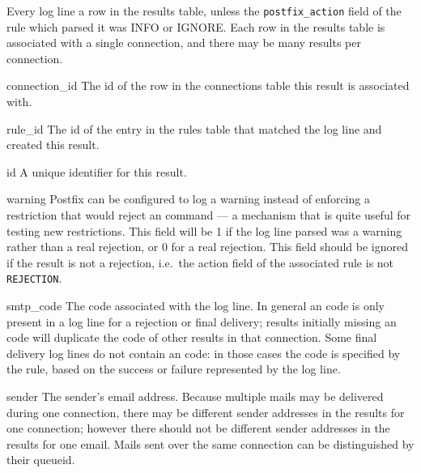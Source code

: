 \label{results table}

Every log line a row in the results table, unless the
\texttt{postfix\_action} field of the rule which parsed it was INFO or
IGNORE\@.  Each row in the results table is associated with a single
connection, and there may be many results per connection.

\begin{eqlist}

    \item [connection\_id] The id of the row in the connections table this
        result is associated with.

    \item [rule\_id] The id of the entry in the rules table that matched
        the log line and created this result.

    \item [id] A unique identifier for this result.

    \item [warning] Postfix can be configured to log a warning instead of
        enforcing a restriction that would reject an \SMTP{} command --- a
        mechanism that is quite useful for testing new restrictions.  This
        field will be 1 if the log line parsed was a warning rather than a
        real rejection, or 0 for a real rejection.  This field should be
        ignored if the result is not a rejection, i.e.\ the action field of
        the associated rule is not \texttt{REJECTION}.

    \item [smtp\_code] The \SMTP{} code associated with the log line.  In
        general an \SMTP{} code is only present in a log line for a
        rejection or final delivery; results initially missing an \SMTP{}
        code will duplicate the \SMTP{} code of other results in that
        connection.  Some final delivery log lines do not contain an
        \SMTP{} code: in those cases the code is specified by the rule,
        based on the success or failure represented by the log line.

    \item [sender] The sender's email address.  Because multiple mails may
        be delivered during one connection, there may be different sender
        addresses in the results for one connection; however there should
        not be different sender addresses in the results for one email.
        Mails sent over the same connection can be distinguished by their
        queueid.


\end{eqlist}
